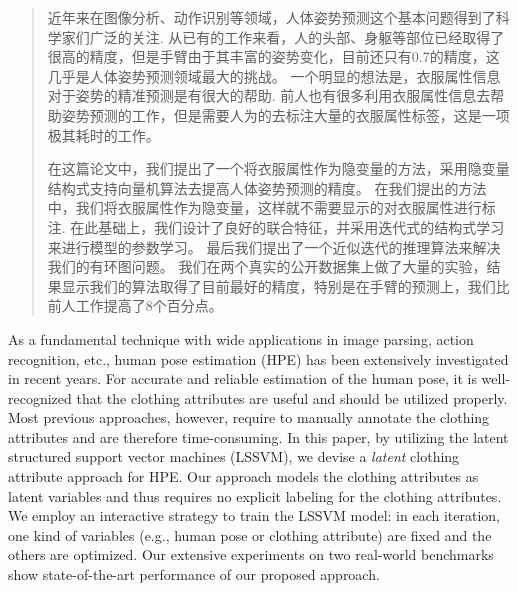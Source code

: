 
\begin{abstract}
近年来在图像分析、动作识别等领域，人体姿势预测这个基本问题得到了科学家们广泛的关注.
从已有的工作来看，人的头部、身躯等部位已经取得了很高的精度，但是手臂由于其丰富的姿势变化，目前还只有0.7的精度，这几乎是人体姿势预测领域最大的挑战。
一个明显的想法是，衣服属性信息对于姿势的精准预测是有很大的帮助.
前人也有很多利用衣服属性信息去帮助姿势预测的工作，但是需要人为的去标注大量的衣服属性标签，这是一项极其耗时的工作。

在这篇论文中，我们提出了一个将衣服属性作为隐变量的方法，采用隐变量结构式支持向量机算法去提高人体姿势预测的精度。
在我们提出的方法中，我们将衣服属性作为隐变量，这样就不需要显示的对衣服属性进行标注.
在此基础上，我们设计了良好的联合特征，并采用迭代式的结构式学习来进行模型的参数学习。
最后我们提出了一个近似迭代的推理算法来解决我们的有环图问题。
我们在两个真实的公开数据集上做了大量的实验，结果显示我们的算法取得了目前最好的精度，特别是在手臂的预测上，我们比前人工作提高了8个百分点。

\end{abstract}

\begin{englishabstract}
As a fundamental technique with wide applications in image parsing, action recognition, etc., 
human pose estimation (HPE) has been extensively investigated in recent years. 
For accurate and reliable estimation of the human pose, it is well-recognized that the clothing attributes are useful and should be utilized properly. 
Most previous approaches, however, require to manually annotate the clothing attributes and are therefore time-consuming. 
In this paper, by utilizing the latent structured support vector machines (LSSVM), we devise a \emph{latent} clothing attribute approach for HPE. 
Our approach models the clothing attributes as latent variables and thus requires no explicit labeling for the clothing attributes. 
We employ an interactive strategy to train the LSSVM model: in each iteration, one kind of variables (e.g., human pose or clothing attribute) are fixed and the others are optimized. 
Our extensive experiments on two real-world benchmarks show state-of-the-art performance of our proposed approach.

\end{englishabstract}
